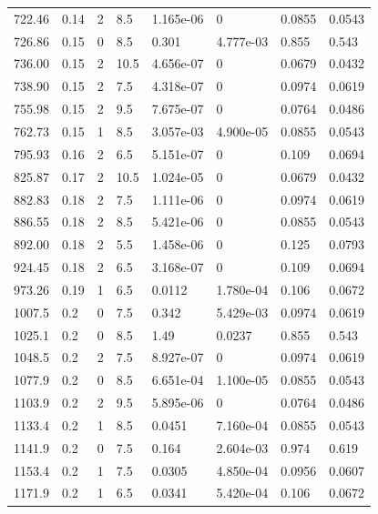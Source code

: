\documentclass[preview]{standalone}
\begin{document}
{{{\begin{tabular}{L{1.2cm}C{1.2cm} C{0.3cm}C{0.5cm} C{1.4cm}C{1.4cm} C{1.4cm}C{1.4cm}}
  722.46  &  0.14  & 2     & 8.5 &  1.165e-06  & 0  & 0.0855 &  0.0543   \\ 
  726.86  &  0.15  & 0     & 8.5 &  0.301  & 4.777e-03  & 0.855 &  0.543   \\ 
  736.00  &  0.15  & 2     & 10.5 &  4.656e-07  & 0  & 0.0679 &  0.0432   \\ 
  738.90  &  0.15  & 2     & 7.5 &  4.318e-07  & 0  & 0.0974 &  0.0619   \\ 
  755.98  &  0.15  & 2     & 9.5 &  7.675e-07  & 0  & 0.0764 &  0.0486   \\ 
  762.73  &  0.15  & 1     & 8.5 &  3.057e-03  & 4.900e-05  & 0.0855 &  0.0543   \\ 
  795.93  &  0.16  & 2     & 6.5 &  5.151e-07  & 0  & 0.109 &  0.0694   \\ 
  825.87  &  0.17  & 2     & 10.5 &  1.024e-05  & 0  & 0.0679 &  0.0432   \\ 
  882.83  &  0.18  & 2     & 7.5 &  1.111e-06  & 0  & 0.0974 &  0.0619   \\ 
  886.55  &  0.18  & 2     & 8.5 &  5.421e-06  & 0  & 0.0855 &  0.0543   \\ 
  892.00  &  0.18  & 2     & 5.5 &  1.458e-06  & 0  & 0.125 &  0.0793   \\ 
  924.45  &  0.18  & 2     & 6.5 &  3.168e-07  & 0  & 0.109 &  0.0694   \\ 
  973.26  &  0.19  & 1     & 6.5 &  0.0112  & 1.780e-04  & 0.106 &  0.0672   \\ 
  1007.5  &   0.2  & 0     & 7.5 &  0.342  & 5.429e-03  & 0.0974 &  0.0619   \\ 
  1025.1  &   0.2  & 0     & 8.5 &  1.49  & 0.0237  & 0.855 &  0.543   \\ 
  1048.5  &   0.2  & 2     & 7.5 &  8.927e-07  & 0  & 0.0974 &  0.0619   \\ 
  1077.9  &   0.2  & 0     & 8.5 &  6.651e-04  & 1.100e-05  & 0.0855 &  0.0543   \\ 
  1103.9  &   0.2  & 2     & 9.5 &  5.895e-06  & 0  & 0.0764 &  0.0486   \\ 
  1133.4  &   0.2  & 1     & 8.5 &  0.0451  & 7.160e-04  & 0.0855 &  0.0543   \\ 
  1141.9  &   0.2  & 0     & 7.5 &  0.164  & 2.604e-03  & 0.974 &  0.619   \\ 
  1153.4  &   0.2  & 1     & 7.5 &  0.0305  & 4.850e-04  & 0.0956 &  0.0607   \\ 
  1171.9  &   0.2  & 1     & 6.5 &  0.0341  & 5.420e-04  & 0.106 &  0.0672   \\ 

\end{tabular}}}}
\end{document}
